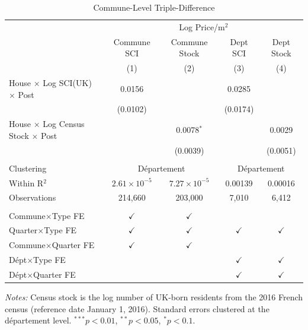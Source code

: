 
\begin{table}[htbp]
   \caption{\label{tab:commune} Commune-Level Triple-Difference}
   \bigskip
   \centering
   \begin{tabular}{lcccc}
      \toprule
       & \multicolumn{4}{c}{Log Price/m$^2$}\\
                                                            & Commune SCI           & Commune Stock         & Dept SCI      & Dept Stock \\
                                                            & (1)                   & (2)                   & (3)           & (4)\\
      \midrule
      House $\times$ Log SCI(UK) $\times$ Post              & 0.0156                &                       & 0.0285        &   \\
                                                             & (0.0102)              &                       & (0.0174)      &   \\
      House $\times$ Log Census Stock $\times$ Post          &                       & 0.0078$^{*}$          &               & 0.0029\\
                                                             &                       & (0.0039)              &               & (0.0051)\\
       \\
      Clustering & \multicolumn{2}{c}{D\'{e}partement} & \multicolumn{2}{c}{D\'{e}partement} \\
      Within R$^2$                                           & $2.61\times 10^{-5}$  & $7.27\times 10^{-5}$  & 0.00139       & 0.00016\\
      Observations                                           & 214,660               & 203,000               & 7,010         & 6,412\\
       \\
      Commune$\times$Type FE                                 & $\checkmark$          & $\checkmark$          &               & \\
      Quarter$\times$Type FE                                 & $\checkmark$          & $\checkmark$          & $\checkmark$  & $\checkmark$\\
      Commune$\times$Quarter FE                              & $\checkmark$          & $\checkmark$          &               & \\
      D\'{e}pt$\times$Type FE                                &                       &                       & $\checkmark$  & $\checkmark$\\
      D\'{e}pt$\times$Quarter FE                             &                       &                       & $\checkmark$  & $\checkmark$\\
      \bottomrule
   \end{tabular}
   \par\vspace{0.5em}\noindent\footnotesize{\textit{Notes:} Census stock is the log number of UK-born residents from the 2016 French census (reference date January 1, 2016). Standard errors clustered at the d\'{e}partement level. $^{***}p<0.01$, $^{**}p<0.05$, $^{*}p<0.1$.}
\end{table}

